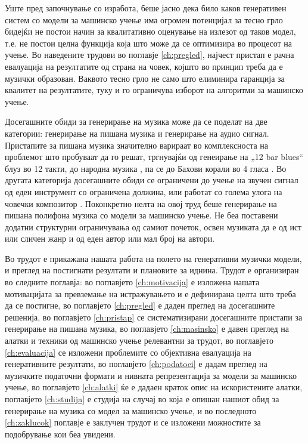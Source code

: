 Уште пред започнување со изработа, беше јасно дека било каков генеративен систем со модели за машинско учење има огромен потенцијал за тесно грло бидејќи не постои начин за квалитативно оценување на излезот од таков модел, т.е. не постои целна функција која што може да се оптимизира во процесот на учење. Во наведените трудови во поглавје \ref{ch:pregled}, најчест пристап е рачна евалуација на резултатите од страна на човек, којшто во принцип треба да е музички образован. Ваквото тесно грло не само што елиминира гаранција за квалитет на резултатите, туку и го ограничува изборот на алгоритми за машинско учење. 

Досегашните обиди за генерирање на музика може да се поделат на две категории: генерирање на пишана музика и генерирање на аудио сигнал. Пристапите за пишана музика значително варираат во комплексноста на проблемот што пробуваат да го решат, тргнувајќи од генеирање на „12 bar blues“ \cite{Eck2002} блуз во 12 такти, до народна музика \cite{Sturm2016}, па се до Бахови корали во 4 гласа \cite{Liang2017,Hadjeres2016}. Во другата категорија досегашните обиди \cite{Oord2016} се ограничени до учење на звучен сигнал од еден инструмент со ограничена должина, или работат со голема улога на човечки композитор \cite{Ghedini2015}. Поконкретно нелта на овој труд беше генерирање на пишана полифона музика со модели за машинско учење. Не беа поставени додатни структурни ограничувања од самиот почеток, освен музиката да е од ист или сличен жанр и од еден автор или мал број на автори.

Во трудот е прикажана нашата работа на полето на генеративни музички модели, и преглед на постигнати резултати и плановите за иднина. Трудот е организиран во следните поглавја: во поглавјето \ref{ch:motivacija} е изложена нашата мотивацијата за превземање на истражувањето и е дефинирана целта што треба да се постигне, во поглавјето \ref{ch:pregled} е даден преглед на досегашните решенија, во поглавјето \ref{ch:pristap} се систематизирани досегашните пристапи за генерирање на пишана музика, во поглавјето \ref{ch:masinsko} е давен преглед на алатки и техники од машинско учење релевантни за трудот, во поглавјето \ref{ch:evaluacija} се изложени проблемите со објективна евалуација на генеративните резултати, во поглавјето \ref{ch:podatoci} е дадам преглед на музичките податочни формати и нивната репрезентација за модели за машинско учење, во поглавјето \ref{ch:alatki} ќе е дадаен краток опис на искористените алатки, поглавјето \ref{ch:studija} е студија на случај во која е опишан нашиот обид за генерирање на музика со модел за машинско учење, и во последното \ref{ch:zaklucok} поглавје е заклучен трудот и се изложени можностите за подобрување кои беа увидени.


